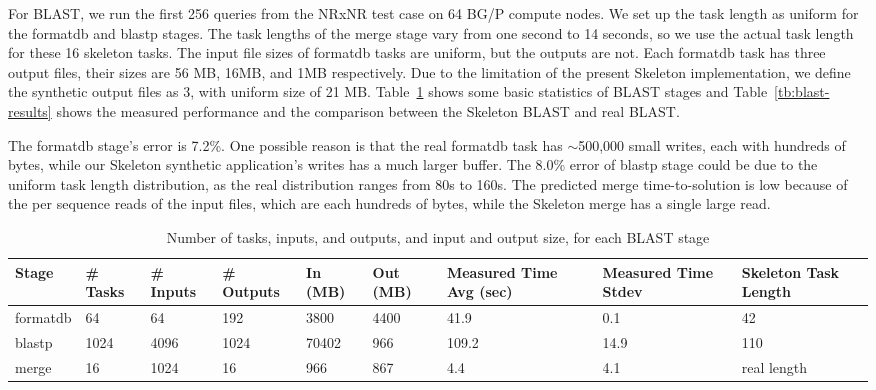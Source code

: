 \documentclass{sig-alternate}
\newcommand{\up}{\vspace*{-1em}}
\newcommand{\katznote}[1]{ {\textcolor{blue}    { ***Dan:      #1 }}}
\newcommand{\zhaonote}[1]{{\textcolor{darkgreen}    { ***Zhao:      #1 }}}
\newcommand{\katznote}[1]{}
\newcommand{\zhaonote}[1]{}
\begin{document}
For BLAST, we run the first 256 queries from the NRxNR test case on 64 BG/P compute nodes. We set up the task length as uniform for the formatdb and blastp stages. The task lengths of the merge stage vary from one second to 14 seconds, so we use the actual task length for these 16 skeleton tasks. 
The input file sizes of formatdb tasks are uniform, but the outputs are not. Each formatdb task has three output files, their sizes are 56 MB, 16MB, and 1MB respectively. Due to the limitation of the present Skeleton implementation, we define the synthetic output files as 3, with uniform size of 21 MB.
Table~\ref{tb:blast-stats} shows some basic statistics of BLAST stages and Table~\ref{tb:blast-results} shows the measured performance and the comparison between the Skeleton BLAST and real BLAST. 

The formatdb stage's error is 7.2\%. One possible reason is that the real formatdb task has $\sim$500,000 small writes, each with hundreds of bytes, while our Skeleton synthetic application's writes has a much larger buffer. The 8.0\% error of blastp stage could be due to the uniform task length distribution, as the real distribution ranges from 80s to 160s.
The predicted merge time-to-solution is low because of the per sequence reads of the input files, which are each hundreds of bytes, while the Skeleton merge has a single large read.  

\begin{table}[t]
\begin{center}
    \caption{Number of tasks, inputs, and outputs, and input and output size, for each BLAST stage}
    \begin{scriptsize}
    \begin{tabular}{ | p{1.6cm} | p{1cm} | p{1cm} | p{1.2cm} | p{1cm} | p{1.25cm} | p{2cm} | p{1.5cm} | p{1.5cm} |}
    \hline
    Stage & \# Tasks & \# Inputs & \# Outputs & In (MB) & Out (MB) & Measured Time Avg (sec) & Measured Time Stdev & Skeleton Task Length\\ \hline \hline
	formatdb & 64 & 64 & 192 & 3800 & 4400 & 41.9 & 0.1 & 42\\ \hline
	blastp & 1024 & 4096 & 1024 & 70402 & 966 & 109.2 & 14.9 & 110\\ \hline
	merge & 16 & 1024 & 16 & 966 & 867 & 4.4 & 4.1 & real length\\ \hline
    \end{tabular}
    \end{scriptsize}
    \label{tb:blast-stats}
    \up
\end{center}   
\end{table}
\end{document}
